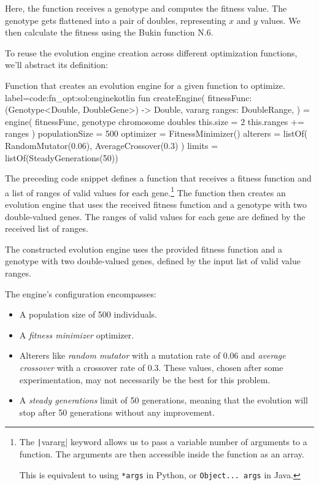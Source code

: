     Here, the function receives a genotype and computes the fitness value. The genotype gets flattened into a pair of doubles, representing \(x\) and \(y\) values. We then calculate the fitness using the Bukin function N.6.

    To reuse the evolution engine creation across different optimization functions, we'll abstract its definition:

    \begin{code}{
      Function that creates an evolution engine for a given function to optimize.
    }{label=code:fn_opt:sol:engine}{kotlin}
      fun createEngine(
          fitnessFunc: (Genotype<Double, DoubleGene>) -> Double,
          vararg ranges: DoubleRange,
      ) = engine(
          fitnessFunc,
          genotype {
              chromosome {
                  doubles {
                      this.size = 2
                      this.ranges += ranges
                  }
              }
          }
      ) {
          populationSize = 500
          optimizer = FitnessMinimizer()
          alterers = listOf(
              RandomMutator(0.06),
              AverageCrossover(0.3)
          )
          limits = listOf(SteadyGenerations(50))
      }
    \end{code}

    The preceding code snippet defines a function that receives a fitness
    function and a list of ranges of valid values for each gene.\footnote{
      The \texttt|vararg| keyword allows us to pass a variable
      number of arguments to a function. The arguments are then accessible
      inside the function as an array.

      This is equivalent to using \texttt{*args} in Python, or
      \texttt{Object... args} in Java. 
    } The function then creates an evolution engine that uses the received
    fitness function and a genotype with two double-valued genes. The ranges
    of valid values for each gene are defined by the received list of ranges.
    
    The constructed evolution engine uses the provided fitness function and a genotype with two double-valued genes, defined by the input list of valid value ranges.

    The engine's configuration encompasses:

    \begin{itemize}
      \item A population size of 500 individuals.
      \item A \textit{fitness minimizer} optimizer.
      \item Alterers like \textit{random mutator} with a mutation rate of 0.06 
        and \textit{average crossover} with a crossover rate of 0.3. These
        values, chosen after some experimentation, may not 
        necessarily be the best for this problem.
      \item A \textit{steady generations} limit of 50 generations, meaning
        that the evolution will stop after 50 generations without any
        improvement.
    \end{itemize}

